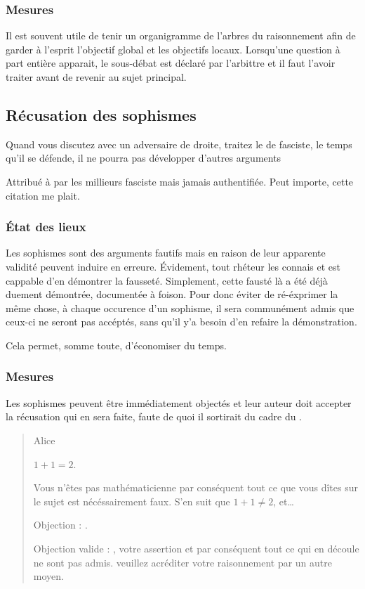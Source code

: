 \subsubsection{Mesures}
Il est souvent utile de tenir un organigramme de l’arbres du raisonnement afin de garder à l’esprit l’objectif global et les objectifs locaux. Lorsqu’une question à part entière apparait, le sous-débat est déclaré par l’arbittre et il faut l’avoir traiter avant de revenir au sujet principal.

\subsection{Récusation des sophismes}
\epigraph{Quand vous discutez avec un adversaire de droite, traitez le de fasciste, le temps qu’il se défende, il ne pourra pas développer d’autres arguments}{Attribué à  par les millieurs fasciste mais jamais authentifiée. Peut importe, cette citation me plait.}
\subsubsection{État des lieux}
Les sophismes sont des arguments fautifs mais en raison de leur apparente validité peuvent induire en erreure. Évidement, tout rhéteur les connais et est cappable d’en démontrer la fausseté. Simplement, cette fausté là a été déjà duement démontrée, documentée à foison. Pour donc éviter de ré-éxprimer la même chose, à chaque occurence d’un sophisme, il sera communément admis que ceux-ci ne seront pas accéptés, sans qu’il y’a besoin d’en refaire la démonstration.

Cela permet, somme toute, d’économiser du temps.

\subsubsection{Mesures}
Les sophismes peuvent être immédiatement objectés et leur auteur doit accepter la récusation qui en sera faite, faute de quoi il sortirait du cadre du \mainabbr{}.
\begin{quote}
  \begin{drama}{0cm}{0cm}{Alice}

    \Aspeaks       $1+1=2$.

    \Bspeaks       Vous n’êtes pas mathématicienne par conséquent tout ce que vous dîtes sur le sujet est nécéssairement faux. S’en suit que $1+1\neq2$, et…

    \Aspeaks       Objection : .

    \Arbitrespeaks Objection valide : \B, votre assertion et par conséquent tout ce qui en découle ne sont pas admis. veuillez acréditer votre raisonnement par un autre moyen.

  \end{drama}
\end{quote}

